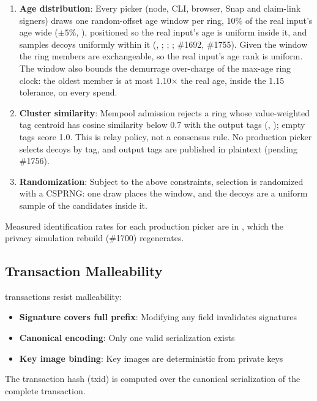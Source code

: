 \begin{enumerate}
  \item \textbf{Age distribution}: Every picker (node, CLI, browser, Snap
    and claim-link signers) draws one random-offset age window per ring,
    10\% of the real input's age wide ($\pm 5\%$,
    ), positioned so the real input's age is
    uniform inside it, and samples decoys uniformly within it
    (, ;
    ;
    ; \#1692, \#1755). Given the
    window the ring members are exchangeable, so the real input's age rank
    is uniform. The window also bounds the demurrage over-charge of the
    max-age ring clock: the oldest member is at most 1.10$\times$ the real
    age, inside the 1.15 tolerance, on every spend.

  \item \textbf{Cluster similarity}: Mempool admission rejects a ring whose
    value-weighted tag centroid has cosine similarity below 0.7 with the
    output tags (,
    ); empty tags score 1.0. This is relay
    policy, not a consensus rule. No production picker selects decoys by
    tag, and output tags are published in plaintext (pending \#1756).

  \item \textbf{Randomization}: Subject to the above constraints, selection
    is randomized with a CSPRNG: one draw places the window, and the
    decoys are a uniform sample of the candidates inside it.
\end{enumerate}

Measured identification rates for each production picker are in
, which the privacy
simulation rebuild (\#1700) regenerates.

\subsection{Transaction Malleability}

\Botho transactions resist malleability:
\begin{itemize}
  \item \textbf{Signature covers full prefix}: Modifying any field
    invalidates signatures
  \item \textbf{Canonical encoding}: Only one valid serialization exists
  \item \textbf{Key image binding}: Key images are deterministic from
    private keys
\end{itemize}

The transaction hash (txid) is computed over the canonical serialization
of the complete transaction.
